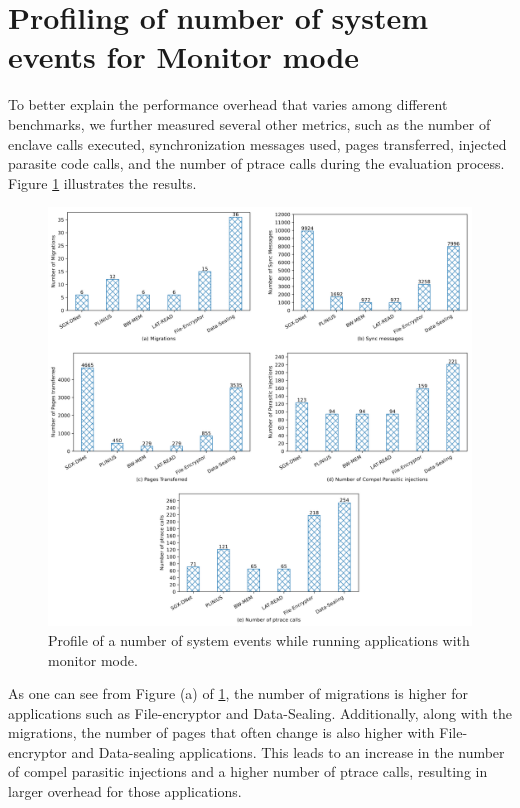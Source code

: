 \documentclass[article, doublespace,nopageskip]{VTthesis} %
\begin{document}
    \section{Profiling of number of system events for Monitor mode} \label{sse:system_call_events_monitor_mode}
    To better explain the performance overhead that varies among different benchmarks, we further measured several other metrics, such as the number of enclave calls executed, synchronization messages used, pages transferred, injected parasite code calls, and the number of ptrace calls during the evaluation process. Figure \ref{fig:client_instructions} illustrates the results.

    \begin{figure}[H]
    \centering
    \includegraphics[scale=1.1]{figures/perf_char_monitor.png}
    \caption{Profile of a number of system events while running applications with monitor mode.} 
    \label{fig:client_instructions}
    \end{figure}

    As one can see from Figure (a) of \ref{fig:client_instructions}, the number of migrations is higher for applications such as File-encryptor and Data-Sealing. Additionally, along with the migrations, the number of pages that often change is also higher with File-encryptor and Data-sealing applications. This leads to an increase in the number of compel parasitic injections and a higher number of ptrace calls, resulting in larger overhead for those applications.
    
\end{document}
